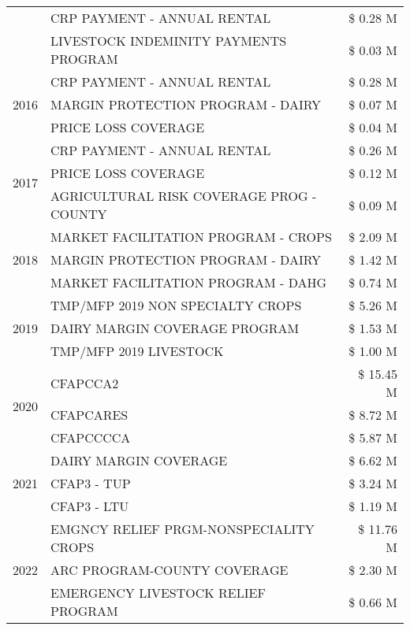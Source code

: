 \begin{tabular}{llr}
 & CRP PAYMENT - ANNUAL RENTAL & \$ 0.28 M \\
 & LIVESTOCK INDEMINITY PAYMENTS PROGRAM & \$ 0.03 M \\
\cline{1-3}
\multirow[t]{3}{*}{2016} & CRP PAYMENT - ANNUAL RENTAL & \$ 0.28 M \\
 & MARGIN PROTECTION PROGRAM - DAIRY & \$ 0.07 M \\
 & PRICE LOSS COVERAGE & \$ 0.04 M \\
\cline{1-3}
\multirow[t]{3}{*}{2017} & CRP PAYMENT - ANNUAL RENTAL & \$ 0.26 M \\
 & PRICE LOSS COVERAGE & \$ 0.12 M \\
 & AGRICULTURAL RISK COVERAGE PROG - COUNTY & \$ 0.09 M \\
\cline{1-3}
\multirow[t]{3}{*}{2018} & MARKET FACILITATION PROGRAM - CROPS & \$ 2.09 M \\
 & MARGIN PROTECTION PROGRAM - DAIRY & \$ 1.42 M \\
 & MARKET FACILITATION PROGRAM - DAHG & \$ 0.74 M \\
\cline{1-3}
\multirow[t]{3}{*}{2019} & TMP/MFP 2019 NON SPECIALTY CROPS & \$ 5.26 M \\
 & DAIRY MARGIN COVERAGE PROGRAM & \$ 1.53 M \\
 & TMP/MFP 2019 LIVESTOCK & \$ 1.00 M \\
\cline{1-3}
\multirow[t]{3}{*}{2020} & CFAPCCA2 & \$ 15.45 M \\
 & CFAPCARES & \$ 8.72 M \\
 & CFAPCCCCA & \$ 5.87 M \\
\cline{1-3}
\multirow[t]{3}{*}{2021} & DAIRY MARGIN COVERAGE & \$ 6.62 M \\
 & CFAP3 - TUP & \$ 3.24 M \\
 & CFAP3 - LTU & \$ 1.19 M \\
\cline{1-3}
\multirow[t]{3}{*}{2022} & EMGNCY RELIEF PRGM-NONSPECIALITY CROPS & \$ 11.76 M \\
 & ARC PROGRAM-COUNTY COVERAGE & \$ 2.30 M \\
 & EMERGENCY LIVESTOCK RELIEF PROGRAM & \$ 0.66 M \\
\cline{1-3}
\bottomrule
\end{tabular}

